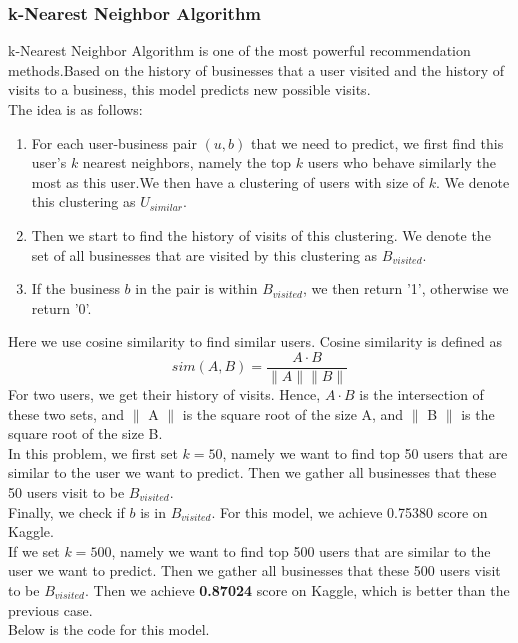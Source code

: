 \documentclass[a4paper]{article}
\begin{document}
\subsubsection{k-Nearest Neighbor Algorithm}
k-Nearest Neighbor Algorithm is one of the most powerful recommendation methods.Based on the history of businesses that a user visited and the history of visits to a business, this model predicts new possible visits.\\
The idea is as follows:\\
\begin{enumerate}
\item For each user-business pair $(u,b)$ that we need to predict, we first find this user's $k$ nearest neighbors, namely the top $k$ users who behave similarly the most as this user.We then have a clustering of users with size of $k$. We denote this clustering as $U_{similar}$.
\item Then we start to find the history of visits of this clustering. We denote the set of all businesses that are visited by this clustering as $B_{visited}$.
\item If the business $b$ in the pair is within $B_{visited}$, we then return '1', otherwise we return '0'.
\end{enumerate}
Here we use cosine similarity to find similar users. Cosine similarity is defined as
\begin{equation}
sim(A,B)=\frac{A \cdot B}{\parallel A \parallel \parallel B \parallel}
\end{equation}
For two users, we get their history of visits. Hence, $A \cdot B$ is the intersection of these two sets, and $\parallel$ A $\parallel$ is the square root of the size A, and $\parallel$ B $\parallel$ is the square root of the size B.\\
In this problem, we first set $k = 50$, namely we want to find top 50 users that are similar to the user we want to predict. Then we gather all businesses that these 50 users visit to be $B_{visited}$.\\
Finally, we check if $b$ is in $B_{visited}$. For this model, we achieve 0.75380 score on Kaggle.\\
If we set $k = 500$, namely we want to find top 500 users that are similar to the user we want to predict. Then we gather all businesses that these 500 users visit to be $B_{visited}$. Then we achieve \textbf{0.87024} score on Kaggle, which is better than the previous case.\\
Below is the code for this model.
\end{document}
